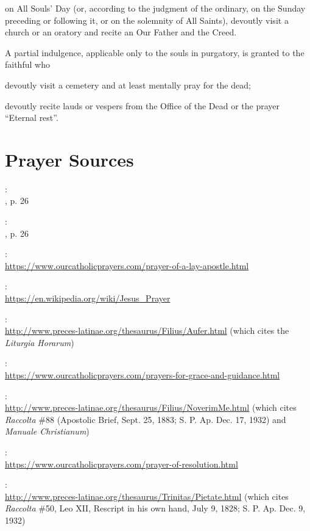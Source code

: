 \documentclass[12pt]{article}
\newcommand{\emphasis}[1]{\emph{#1}}
\newcommand{\emphasis}[1]{\textsl{#1}}
\newcommand{\foreign}[1]{\emphasis{#1}}
\begin{document}
 on All Souls' Day (or, according to the judgment of the ordinary, on the Sunday preceding or following it, or on the solemnity of All Saints), devoutly visit a church or an oratory and recite an Our Father and the Creed.

 A partial indulgence, applicable only to the souls in purgatory, is granted to the faithful who

 devoutly visit a cemetery and at least mentally pray for the dead;

 devoutly recite lauds or vespers from the Office of the Dead or the prayer ``Eternal rest''.

\newpage
\section{Prayer Sources}
\newcommand{\urlsource}[1]{:\\{\footnotesize\url{#1}}}

:\\
, p. 26

:\\
, p. 26

\urlsource{https://www.ourcatholicprayers.com/prayer-of-a-lay-apostle.html}

\urlsource{https://en.wikipedia.org/wiki/Jesus_Prayer}

\urlsource{http://www.preces-latinae.org/thesaurus/Filius/Aufer.html} (which cites the \foreign{Liturgia Horarum})

\urlsource{https://www.ourcatholicprayers.com/prayers-for-grace-and-guidance.html}

\urlsource{http://www.preces-latinae.org/thesaurus/Filius/NoverimMe.html} (which cites \foreign{Raccolta} \#88 (Apostolic Brief, Sept. 25, 1883; S. P. Ap. Dec. 17, 1932) and \foreign{Manuale Christianum})

\urlsource{https://www.ourcatholicprayers.com/prayer-of-resolution.html}

\urlsource{http://www.preces-latinae.org/thesaurus/Trinitas/Pietate.html} (which cites \foreign{Raccolta} \#50, Leo XII, Rescript in his own hand, July 9, 1828; S. P. Ap. Dec. 9, 1932)
\end{document}
